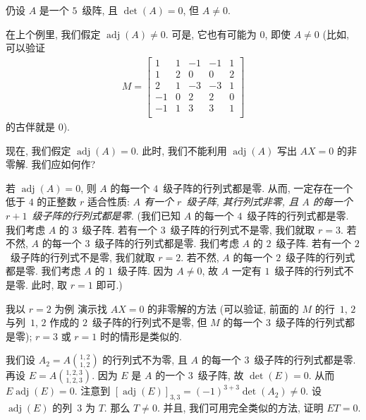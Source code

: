 \begin{example}
    仍设 \(A\) 是一个 \(5\)~级阵,
    且 \(\det {(A)} = 0\),
    但 \(A \neq 0\).

    在上个例里, 我们假定
    \(\operatorname{adj} {(A)} \neq 0\).
    可是, 它也有可能为 \(0\), 即使 \(A \neq 0\)
    (比如, 可以验证
    \begin{align*}
        M = \begin{bmatrix}
                1  & 1 & -1 & -1 & 1 \\
                1  & 2 & 0  & 0  & 2 \\
                2  & 1 & -3 & -3 & 1 \\
                -1 & 0 & 2  & 2  & 0 \\
                -1 & 1 & 3  & 3  & 1 \\
            \end{bmatrix}
    \end{align*}
    的古伴就是 \(0\)).

    现在, 我们假定
    \(\operatorname{adj} {(A)} = 0\).
    此时, 我们不能利用
    \(\operatorname{adj} {(A)}\)
    写出 \(AX = 0\) 的非零解.
    我们应如何作?

    若 \(\operatorname{adj} {(A)} = 0\),
    则 \(A\) 的每一个 \(4\)~级子阵的行列式都是零.
    从而, 一定存在一个%
    低于 \(4\) 的正整数 \(r\)
    适合性质:
    \emph{\(A\) 有一个 \(r\)~级子阵, 其行列式非零,
        且 \(A\) 的每一个 \(r+1\)~级子阵的行列式都是零.}
    (我们已知 \(A\) 的每一个 \(4\)~级子阵的行列式都是零.
    我们考虑 \(A\) 的 \(3\)~级子阵.
    若有一个 \(3\)~级子阵的行列式不是零,
    我们就取 \(r = 3\).
    若不然, \(A\) 的每一个 \(3\)~级子阵的行列式都是零.
    我们考虑 \(A\) 的 \(2\)~级子阵.
    若有一个 \(2\)~级子阵的行列式不是零,
    我们就取 \(r = 2\).
    若不然, \(A\) 的每一个 \(2\)~级子阵的行列式都是零.
    我们考虑 \(A\) 的 \(1\)~级子阵.
    因为 \(A \neq 0\),
    故 \(A\) 一定有 \(1\)~级子阵的行列式不是零.
    此时, 取 \(r = 1\) 即可.)

    我以 \(r = 2\) 为例%
    演示找 \(AX = 0\) 的非零解的方法
    (可以验证,
    前面的 \(M\) 的行~\(1\), \(2\)
    与列~\(1\), \(2\) 作成的
    \(2\)~级子阵的行列式不是零,
    但 \(M\) 的每一个 \(3\)~级子阵的行列式都是零);
    \(r = 3\) 或 \(r = 1\) 时的情形是类似的.

    我们设
    \(\displaystyle
    A_2 =
    A\binom{1,2}{1,2}
    \)
    的行列式不为零,
    且 \(A\) 的每一个 \(3\)~级子阵的行列式都是零.
    再设
    \(\displaystyle
    E =
    A\binom{1,2,3}{1,2,3}
    \).
    因为 \(E\) 是 \(A\) 的一个 \(3\)~级子阵,
    故 \(\det {(E)} = 0\).
    从而
    \(E \operatorname{adj} {(E)} = 0\).
    注意到
    \([\operatorname{adj} {(E)}]_{3,3}
    = (-1)^{3+3} \det {(A_2)} \neq 0\).
    设 \(\operatorname{adj} {(E)}\)
    的列~\(3\) 为 \(T\).
    那么 \(T \neq 0\).
    并且, 我们可用完全类似的方法, 证明
    \(ET = 0\).


\end{example}
